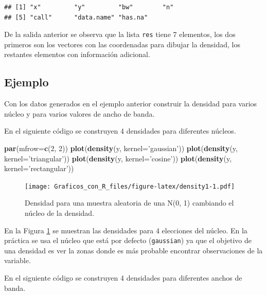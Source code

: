 \documentclass[10pt,]{krantz}
\makeatletter
\newenvironment{Shaded}{\begin{snugshade}}{\end{snugshade}}
\newcommand{\KeywordTok}[1]{\textcolor[rgb]{0.13,0.29,0.53}{\textbf{#1}}}
\newcommand{\DataTypeTok}[1]{\textcolor[rgb]{0.13,0.29,0.53}{#1}}
\newcommand{\DecValTok}[1]{\textcolor[rgb]{0.00,0.00,0.81}{#1}}
\newcommand{\StringTok}[1]{\textcolor[rgb]{0.31,0.60,0.02}{#1}}
\newcommand{\NormalTok}[1]{#1}
\newenvironment{kframe}{%
\medskip{}
\setlength{\fboxsep}{.8em}
 \def\at@end@of@kframe{}%
 \ifinner\ifhmode%
  \def\at@end@of@kframe{\end{minipage}}%
  \begin{minipage}{\columnwidth}%
 \fi\fi%
 \def\FrameCommand##1{\hskip\@totalleftmargin \hskip-\fboxsep
 \colorbox{shadecolor}{##1}\hskip-\fboxsep
     \hskip-\linewidth \hskip-\@totalleftmargin \hskip\columnwidth}%
 \MakeFramed {\advance\hsize-\width
   \@totalleftmargin\z@ \linewidth\hsize
   \@setminipage}}%
 {\par\unskip\endMakeFramed%
 \at@end@of@kframe}
\renewenvironment{Shaded}{\begin{kframe}}{\end{kframe}}
\makeatother
\begin{document}
\begin{verbatim}
## [1] "x"         "y"         "bw"        "n"        
## [5] "call"      "data.name" "has.na"
\end{verbatim}

De la salida anterior se observa que la lista \texttt{res} tiene 7
elementos, los dos primeros son los vectores con las coordenadas para
dibujar la densidad, los restantes elementos con información adicional.

\subsection*{Ejemplo}\label{ejemplo-7}


Con los datos generados en el ejemplo anterior construir la densidad
para varios núcleo y para varios valores de ancho de banda.

En el siguiente código se construyen 4 densidades para diferentes
núcleos.

\begin{Shaded}
\begin{Highlighting}[]
\KeywordTok{par}\NormalTok{(}\DataTypeTok{mfrow=}\KeywordTok{c}\NormalTok{(}\DecValTok{2}\NormalTok{, }\DecValTok{2}\NormalTok{))}
\KeywordTok{plot}\NormalTok{(}\KeywordTok{density}\NormalTok{(y, }\DataTypeTok{kernel=}\StringTok{'gaussian'}\NormalTok{))}
\KeywordTok{plot}\NormalTok{(}\KeywordTok{density}\NormalTok{(y, }\DataTypeTok{kernel=}\StringTok{'triangular'}\NormalTok{))}
\KeywordTok{plot}\NormalTok{(}\KeywordTok{density}\NormalTok{(y, }\DataTypeTok{kernel=}\StringTok{'cosine'}\NormalTok{))}
\KeywordTok{plot}\NormalTok{(}\KeywordTok{density}\NormalTok{(y, }\DataTypeTok{kernel=}\StringTok{'rectangular'}\NormalTok{))}
\end{Highlighting}
\end{Shaded}

\begin{figure}
\centering
\texttt{[image: Graficos\_con\_R\_files/figure-latex/density1-1.pdf]}
\caption{\label{fig:density1}Densidad para una muestra aleatoria de una N(0,
1) cambiando el núcleo de la densidad.}
\end{figure}

En la Figura \ref{fig:density1} se muestran las densidades para 4
elecciones del núcleo. En la práctica se usa el núcleo que está por
defecto (\texttt{gaussian}) ya que el objetivo de una densidad es ver la
zonas donde es más probable encontrar observaciones de la variable.

En el siguiente código se construyen 4 densidades para diferentes anchos
de banda.
\end{document}
